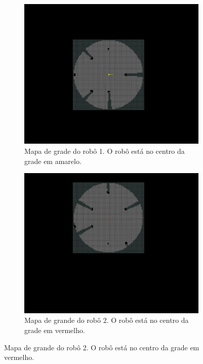 \begin{figure}[]
  \centering
  \begin{subfigure}{0.45\textwidth}
    \includegraphics[width=\textwidth]{figs/grid-rb1.png}
    \caption{Mapa de grade do robô 1. O robô está no centro da grade 
      em amarelo.}
  \end{subfigure}
  \hfill
  \begin{subfigure}{0.45\textwidth}
    \includegraphics[width=\textwidth]{figs/grid-rb2.png}
    \caption{Mapa de grande do robô 2. O robô está no centro da grade 
      em vermelho.}

\end{subfigure}
\end{figure}
